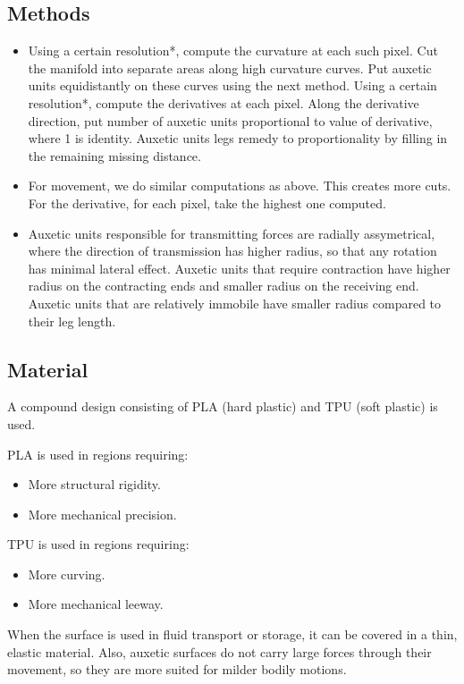 \documentclass{article}
\begin{document}
\subsection{Methods}
\begin{itemize}
  \item Using a certain resolution*, compute the curvature at each such pixel. Cut the manifold into separate areas along high curvature curves. Put auxetic units equidistantly on these curves using the next method. Using a certain resolution*, compute the derivatives at each pixel. Along the derivative direction, put number of auxetic units proportional to value of derivative, where 1 is identity. Auxetic units legs remedy to proportionality by filling in the remaining missing distance.
  \item For movement, we do similar computations as above. This creates more cuts. For the derivative, for each pixel, take the highest one computed.
  \item Auxetic units responsible for transmitting forces are radially assymetrical, where the direction of transmission has higher radius, so that any rotation has minimal lateral effect. Auxetic units that require contraction have higher radius on the contracting ends and smaller radius on the receiving end. Auxetic units that are relatively immobile have smaller radius compared to their leg length.
\end{itemize}

\subsection{Material}
A compound design consisting of PLA (hard plastic) and TPU (soft plastic) is used.

PLA is used in regions requiring:
\begin{itemize}
  \item More structural rigidity.
  \item More mechanical precision.
\end{itemize}

TPU is used in regions requiring:
\begin{itemize}
  \item More curving.
  \item More mechanical leeway.
\end{itemize}

When the surface is used in fluid transport or storage, it can be covered in a thin, elastic material. Also, auxetic surfaces do not carry large forces through their movement, so they are more suited for milder bodily motions.
\end{document}
